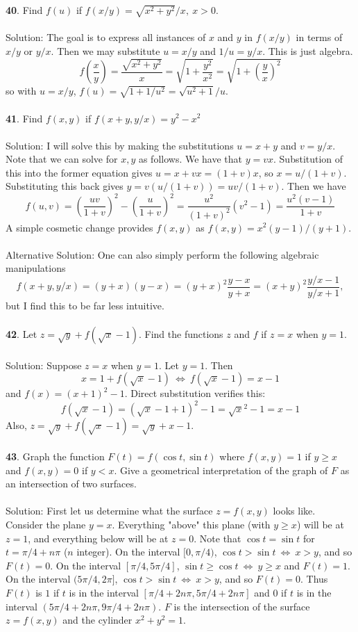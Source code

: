 \documentclass[12pt]{amsbook}
\begin{document}
\noindent
{\small\bf 40}. Find $f(u)$ if $f(x/y) = \sqrt{x^2+y^2}/x, \ x>0$.
\\
\\
{\sc Solution}: The goal is to express all instances of $x$ and $y$ in $f(x/y)$ in terms of $x/y$ or $y/x$. Then we may substitute $u=x/y$ and $1/u=y/x$. This is just algebra.
$$f(\frac{x}{y})=\frac{\sqrt{x^2+y^2}}{x}=\sqrt{1+\frac{y^2}{x^2}}=\sqrt{1+(\frac{y}{x})^2}$$
so with $u=x/y$, $f(u)=\sqrt{1+1/u^2}=\sqrt{u^2+1}/u$.
\\
\\
{\small\bf 41}. Find $f(x,y)$ if $f(x+y,y/x)=y^2-x^2$
\\
\\
{\sc Solution}: I will solve this by making the substitutions $u=x+y$ and $v=y/x$. Note that we can solve for $x,y$ as follows. We have that $y=vx$. Substitution of this into the former equation gives $u=x+vx=(1+v)x$, so $x=u/(1+v)$. Substituting this back gives $y=v(u/(1+v))=uv/(1+v)$. Then we have
$$f(u,v)=(\frac{uv}{1+v})^2-(\frac{u}{1+v})^2=\frac{u^2}{(1+v)^2}(v^2-1)=\frac{u^2(v-1)}{1+v}$$
A simple cosmetic change provides $f(x,y)$ as $f(x,y)=x^2(y-1)/(y+1)$.
\\
\\
{\sc Alternative Solution}: One can also simply perform the following algebraic manipulations
$$f(x+y,y/x)=(y+x)(y-x)=(y+x)^2\frac{y-x}{y+x}=(x+y)^2\frac{y/x-1}{y/x+1},$$
but I find this to be far less intuitive.
\\
\\
{\small\bf 42}. Let $z=\sqrt{y}+f(\sqrt{x}-1)$. Find the functions $z$ and $f$ if $z=x$ when $y=1$.
\\
\\
{\sc Solution}: Suppose $z=x$ when $y=1$. Let $y=1$. Then 
$$x=1+f(\sqrt{x}-1) \ \Leftrightarrow \ f(\sqrt{x}-1)=x-1$$
and $f(x)=(x+1)^2-1$. Direct substitution verifies this:
$$f(\sqrt{x}-1)=(\sqrt{x}-1+1)^2-1=\sqrt{x}^2-1=x-1$$ 
Also, $z=\sqrt{y}+f(\sqrt{x}-1)=\sqrt{y}+x-1$. 
\\
\\
{\small\bf 43}. Graph the function $F(t) = f(\cos t,\sin t)$ where $f(x, y) = 1$ if $y \geq x$ and
$f(x, y) = 0$ if $y < x$. Give a geometrical interpretation of the graph of $F$ as
an intersection of two surfaces.
\\
\\
{\sc Solution}: First let us determine what the surface $z=f(x,y)$ looks like. Consider the plane $y=x$. Everything "above" this plane (with $y \geq x$) will be at $z=1$, and everything below will be at $z=0$. Note that $\cos t = \sin t$ for $t=\pi/4+n\pi$ ($n$ integer). On the interval $[0,\pi/4)$, $\cos t > \sin t \ \Leftrightarrow \ x> y$, and so $F(t)=0$. On the interval $[\pi/4,5\pi/4]$, $\sin t \geq \cos t \ \Leftrightarrow \ y \geq x$ and $F(t)=1$. On the interval $(5\pi/4,2\pi]$, $\cos t > \sin t \ \Leftrightarrow \ x> y$, and so $F(t)=0$. Thus $F(t)$ is $1$ if $t$ is in the interval $[\pi/4+2n\pi, 5\pi/4+2n\pi]$ and $0$ if $t$ is in the interval $(5\pi/4+2n\pi, 9\pi/4+2n\pi)$. $F$ is the intersection of the surface $z=f(x,y)$ and the cylinder $x^2+y^2=1$. 
\end{document}
